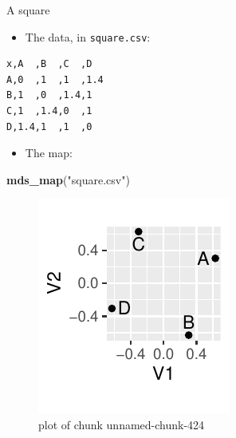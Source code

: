 \documentclass[ignorenonframetext,]{beamer}
\newenvironment{Shaded}{\begin{snugshade}}{\end{snugshade}}
\newcommand{\KeywordTok}[1]{\textcolor[rgb]{0.13,0.29,0.53}{\textbf{#1}}}
\newcommand{\NormalTok}[1]{#1}
\newcommand{\StringTok}[1]{\textcolor[rgb]{0.31,0.60,0.02}{#1}}
\providecommand{\tightlist}{%
  \setlength{\itemsep}{0pt}\setlength{\parskip}{0pt}}
\begin{document}
\begin{frame}[fragile]{A square}
\protect\hypertarget{a-square}{}

\begin{itemize}
\tightlist
\item
  The data, in \texttt{square.csv}:
\end{itemize}

\footnotesize

\begin{verbatim}
x,A  ,B  ,C  ,D
A,0  ,1  ,1  ,1.4
B,1  ,0  ,1.4,1
C,1  ,1.4,0  ,1
D,1.4,1  ,1  ,0
\end{verbatim}

\normalsize

\begin{itemize}
\tightlist
\item
  The map:
\end{itemize}

\begin{Shaded}
\begin{Highlighting}[]
\KeywordTok{mds_map}\NormalTok{(}\StringTok{"square.csv"}\NormalTok{)}
\end{Highlighting}
\end{Shaded}

\begin{figure}
\centering
\includegraphics{figure/unnamed-chunk-424-1.pdf}
\caption{plot of chunk unnamed-chunk-424}
\end{figure}

\end{frame}
\end{document}

